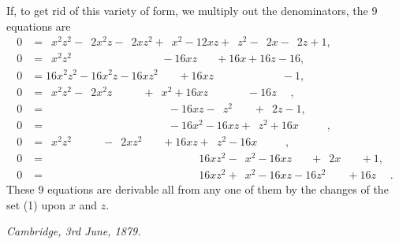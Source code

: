 \documentclass[12pt,a4paper,oneside]{book}
\theoremstyle{plain}
\theoremstyle{definition}
\theoremstyle{remark}
\begin{document}
If, to get rid of this variety of form, we multiply out the denominators, the 9 equations are
\begin{align*}
0&=\phantom{1}x^2z^2-\phantom{1}2x^2z-\phantom{1}2xz^2+\phantom{1}x^2-12xz+\phantom{1}z^2-\phantom{1}2x-\phantom{1}2z+1,\\
0&=\phantom{1}x^2z^2\phantom{-2x^2z-2xz^2+x^2}-16xz\phantom{+z^2}+16x+16z-16,\\
0&=16x^2z^2-16x^2z-16xz^2\phantom{+x^2}+16xz\phantom{+z^2-2x-2z}-1,\\
0&=\phantom{1}x^2z^2-\phantom{1}2x^2z\phantom{-2xz^2}+\phantom{1}x^2+16xz\phantom{+z^2}\phantom{-2x}-16z\phantom{+1},\\
0&=\phantom{16x^2z^2}\phantom{-16x^2z}\phantom{-16xz^2}\phantom{+x^2}-16xz-\phantom{1}z^2\phantom{-2x}+\phantom{1}2z-1,\\
0&=\phantom{16x^2z^2}\phantom{-16x^2z}\phantom{-16xz^2}\phantom{+x^2}-16x^2-16xz+\phantom{1}z^2+16x\phantom{+1}\phantom{-1},\\
0&=\phantom{1}x^2z^2\phantom{-2x^2z}-\phantom{1}2xz^2\phantom{+x^2}+16xz+\phantom{1}z^2-16x\phantom{+1}\phantom{-1},\\
0&=\phantom{16x^2z^2}\phantom{-16x^2z}\phantom{+16xz^2}\phantom{+x^2}\phantom{-16xz}
  16xz^2-\phantom{1}x^2-16xz\phantom{+z^2}+\phantom{1}2x\phantom{+2z}+1,\\
0&=\phantom{16x^2z^2}\phantom{-16x^2z}\phantom{+16xz^2}\phantom{+x^2}\phantom{-16xz}
  16xz^2+\phantom{1}x^2-16xz-16z^2\phantom{+2x}+16z\phantom{+1}.
\end{align*}
These 9 equations are derivable all from any one of them by the changes of the set (1) upon $x$ and $z$.

\begin{flushright}
\textit{Cambridge, 3rd June, 1879.}
\end{flushright}

\vspace{2em}
\noindent\dotfill
\end{document}
